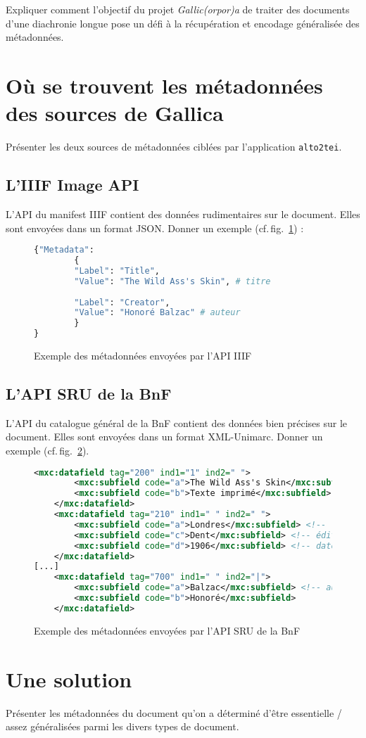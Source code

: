 \documentclass[class=article, crop=false]{standalone}
\begin{document}
Expliquer comment l'objectif du projet \textit{Gallic(orpor)a} de traiter des documents d'une diachronie longue pose un défi à la récupération et encodage généralisée des métadonnées.

\section{Où se trouvent les métadonnées des sources de Gallica}

Présenter les deux sources de métadonnées ciblées par l'application \texttt{alto2tei}.

\subsection{L'IIIF Image API}

L'API du manifest IIIF contient des données rudimentaires sur le document. Elles sont envoyées dans un format JSON. Donner un exemple (cf.\,fig.~\ref{fig:metadata-yaml}) :

\begin{figure}[ht]
\centering
\lstset{style=json}
\begin{lstlisting}[language=Python]
{"Metadata":
		{
		"Label": "Title",
		"Value": "The Wild Ass's Skin", # titre
		
		"Label": "Creator",
		"Value": "Honoré Balzac" # auteur
		}
}
\end{lstlisting}
\caption{Exemple des métadonnées envoyées par l'API IIIF}
\label{fig:metadata-yaml}
\end{figure}

\subsection{L'API SRU de la BnF}

L'API du catalogue général de la BnF contient des données bien précises sur le document. Elles sont envoyées dans un format XML-Unimarc. Donner un exemple (cf.\,fig.~\ref{fig:metadata-unimarc}).

\begin{figure}[ht]
\centering
\begin{lstlisting}[language=XML]
	<mxc:datafield tag="200" ind1="1" ind2=" ">
		<mxc:subfield code="a">The Wild Ass's Skin</mxc:subfield> <!-- titre -->
		<mxc:subfield code="b">Texte imprimé</mxc:subfield>
	</mxc:datafield>
	<mxc:datafield tag="210" ind1=" " ind2=" ">
		<mxc:subfield code="a">Londres</mxc:subfield> <!-- lieu de publication -->
		<mxc:subfield code="c">Dent</mxc:subfield> <!-- éditeur -->
		<mxc:subfield code="d">1906</mxc:subfield> <!-- date de publication -->
	</mxc:datafield>
[...]
	<mxc:datafield tag="700" ind1=" " ind2="|">
		<mxc:subfield code="a">Balzac</mxc:subfield> <!-- auteur -->
		<mxc:subfield code="b">Honoré</mxc:subfield>
	</mxc:datafield>
\end{lstlisting}
\caption{Exemple des métadonnées envoyées par l'API SRU de la BnF}
\label{fig:metadata-unimarc}
\end{figure}

\section{Une solution}

Présenter les métadonnées du document qu'on a déterminé d'être essentielle / assez généralisées parmi les divers types de document.
\end{document}

